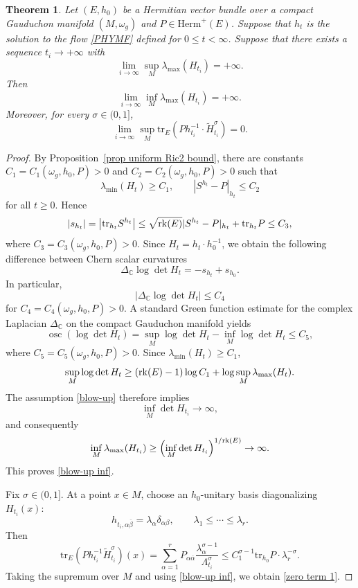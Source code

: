 \documentclass[12pt, reqno]{amsart}
\newcommand{\rk}{{\rm rk}}
\theoremstyle{plain}
\newtheorem{thm}{Theorem}[section]
\theoremstyle{definition}
\newcommand{\btheorem}{\begin{thm}}
\newcommand{\etheorem}{\end{thm}}
\renewcommand{\bar}{\overline}
\newcommand{\beq}{\begin{equation}}
\newcommand{\eeq}{\end{equation}}
\renewcommand{\tilde}{\widetilde}
\renewcommand{\>}{\rightarrow}
\newcommand{\C}{{\mathbb C}}
\renewcommand{\>}{\rightarrow}
\newcommand{\om}{\omega}
\renewcommand{\bar}{\overline}
\renewcommand{\tilde}{\widetilde}
\newcommand{\tr}{\mathrm{tr}}
\numberwithin{equation}{section} %
\begin{document}
\btheorem \label{thm oscillation}
Let  $(E,h_0)$ be a Hermitian vector bundle over a compact Gauduchon manifold
$(M,\omega_g)$ and $P\in \mathrm{Herm}^{+}(E)$.
Suppose that  $h_t$ is the solution to the flow \eqref{PHYMF} defined for $0\leq t <\infty$. Suppose that there exists a sequence $t_i\to+\infty$ with
\beq
\lim_{i\to\infty}\sup_M\lambda_{\max}(H_{t_i})=+\infty.\label{blow-up}
\eeq
Then
\beq
\lim_{i\to\infty}\inf_M\lambda_{\max}(H_{t_i})=+\infty.\label{blow-up inf}
\eeq
Moreover, for every $\sigma\in (0,1]$,
\beq
\lim_{i\to\infty}\sup_M\tr_E\left(Ph_{t_i}^{-1}\cdot \tilde H_{t_i}^\sigma\right)=0.\label{zero term 1}
\eeq
\etheorem
\begin{proof}
    By Proposition~\ref{prop uniform Ric2 bound}, there are constants
    $C_1=C_1(\om_g,h_0,P)>0$ and $C_2=C_2(\om_g,h_0,P)>0$ such that
    \beq
    \lambda_{\min}(H_t)\geq C_1,
    \qquad
    |S^{h_t}-P|_{h_t}\leq C_2
    \eeq
    for all $t\geq0$.  Hence
    \beq
    |s_{h_t}|=\left|\mathrm{tr}_{h_t}S^{h_t}\right|
    \leq \sqrt{\rk(E)}|S^{h_t}-P|_{h_t}+\tr_{h_t}P
    \leq C_3,
    \eeq
    where $C_3=C_3(\om_g,h_0,P)>0$.  Since $H_t=h_t\cdot h_0^{-1}$, we obtain the following difference between Chern scalar curvatures
    \beq
    \Delta_\C\log \det H_t=-s_{h_t}+s_{h_0}.
    \eeq
    In particular,  $$|\Delta_\C\log\det H_t|\leq C_4$$ for
    $C_4=C_4(\om_g,h_0,P)>0$.  A standard Green function estimate for the complex Laplacian
    $\Delta_{\mathbb{C}}$ on the compact Gauduchon manifold yields
    \beq
    \operatorname{osc}\left(\log\det H_t\right)
    =\sup_M\log\det H_t-\inf_M\log\det H_t\leq C_5,
    \label{finite osc}
    \eeq
    where $C_5=C_5(\om_g,h_0,P)>0$.  Since
    $\lambda_{\min}(H_t)\geq C_1$,
    \beq
    \sup_M \log\det H_t
    \geq (\rk(E)-1)\log C_1+\log\sup_M\lambda_{\max}(H_t).
    \eeq
    The assumption \eqref{blow-up} therefore implies
    \beq \inf_M\det H_{t_i}\to\infty, \eeq  and consequently
    \beq
    \inf_M\lambda_{\max}(H_{t_i})
    \geq\left(\inf_M\det H_{t_i}\right)^{1/\rk(E)}\to\infty.
    \eeq
    This proves \eqref{blow-up inf}.

    Fix $\sigma\in(0,1]$.  At a point $x\in M$, choose an $h_0$-unitary basis
    diagonalizing $H_{t_i}(x)$:
    \beq
    h_{t_i,\alpha\bar\beta}=\lambda_\alpha\delta_{\alpha\beta},
    \qquad
    \lambda_1\leq\cdots\leq\lambda_r.
    \eeq
    Then
    \beq
    \tr_E\left(Ph_{t_i}^{-1}\tilde H_{t_i}^\sigma\right)(x)
    =\sum_{\alpha=1}^r P_{\alpha\bar\alpha}
    \frac{\lambda_\alpha^{\sigma-1}}{\Lambda_{t_i}^\sigma}
    \leq C_1^{\sigma-1}\tr_{h_0}P\cdot \lambda_r^{-\sigma}.
    \eeq
    Taking the supremum over $M$ and using \eqref{blow-up inf}, we obtain
    \eqref{zero term 1}.
\end{proof}
\end{document}
